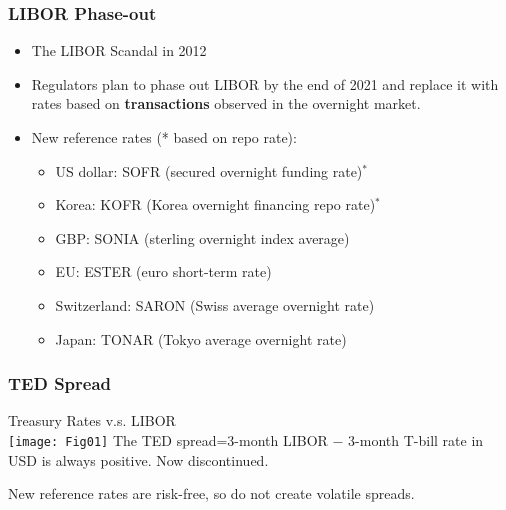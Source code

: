 \documentclass[10pt]{beamer}
\begin{document}
\begin{frame}
	\frametitle{LIBOR Phase-out}
		\begin{itemize}\itemsep5pt
			\item The LIBOR Scandal in 2012
			\item Regulators plan to phase out LIBOR by the end of 2021 and replace it with rates based on \textbf{transactions} observed in the overnight market.
			\item New reference rates \tiny{(* based on repo rate)}:
			\begin{itemize}\itemsep5pt
				\item US dollar: SOFR (secured overnight funding rate)$^*$
				\item Korea: KOFR (Korea overnight financing repo rate)$^*$
				\item GBP: SONIA (sterling overnight index average)
				\item EU: ESTER (euro short-term rate)
				\item Switzerland: SARON (Swiss average overnight rate)
				\item Japan: TONAR (Tokyo average overnight rate) 
			\end{itemize}
			
		\end{itemize}
\end{frame}



\begin{frame}
	\frametitle{TED Spread}
	\begin{center}
		Treasury Rates v.s. LIBOR\\ \vspace{10pt}
		\texttt{[image: Fig01]}
		{\scriptsize The TED spread=3-month LIBOR $-$ 3-month T-bill rate in USD is always positive. Now discontinued. }
	\end{center}
	New reference rates are risk-free, so do not create volatile spreads.
\end{frame}
\end{document}
